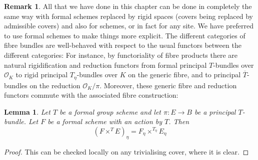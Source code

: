 \documentclass[10pt,oneside]{amsart}
\newtheorem{lemma}[theorem]{Lemma}
\theoremstyle{definition}
\newtheorem{remark}[theorem]{Remark}
\begin{document}
	\begin{remark}\label{appendix in the case of rigid spaces and schemes}
	All that we have done in this chapter can be done in completely the same way with formal schemes replaced by rigid spaces (covers being replaced by admissible covers) and also for schemes, or in fact for any site. We have preferred to use formal schemes to make things more explicit. 
	The different categories of fibre bundles are well-behaved with respect to the usual functors between the different categories: For instance, by functoriality of fibre products there are natural rigidification and reduction functors from formal principal $T$-bundles over $\mathcal O_K$ to rigid principal $T_\eta$-bundles over $K$ on the generic fibre, and to principal $\overline{T}$-bundles on the reduction $\mathcal O_K/\pi$. Moreover, these generic fibre and reduction functors commute with the associated fibre construction:
	\end{remark}
	\begin{lemma}\label{associated bundle commutes with generic fibre}
		Let $T$ be a formal group scheme and let $\pi:E\rightarrow B$ be a principal $T$-bundle. Let $F$ be a formal scheme with an action by $T$. Then
		\[(F\times^T E)_\eta = F_\eta\times^{T_\eta} E_\eta \]
	\end{lemma}
	\begin{proof}
		This can be checked locally on any trivialising cover, where it is clear.
	\end{proof}
  
\end{document}
